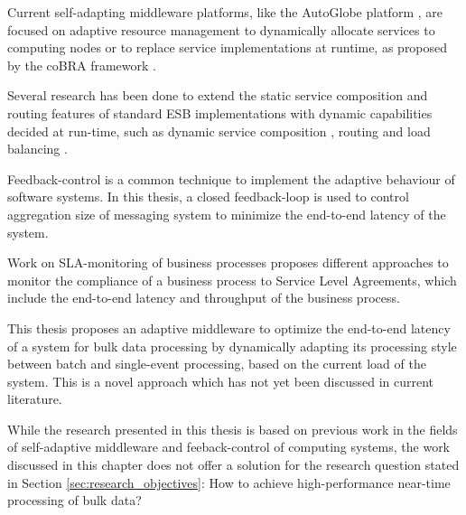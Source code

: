 Current self-adapting middleware platforms, like the AutoGlobe platform \citep{Gmach:2008vo}, are focused on adaptive resource management to dynamically allocate services to computing nodes or to replace service implementations at runtime, as proposed by the coBRA framework \citep{Irmert:2008nx}.

Several research has been done to extend the static service composition and routing features of standard ESB implementations with dynamic capabilities decided at run-time, such as dynamic service composition \citep{Chang:2007aa}, routing \citep{Bai:2007aa} \citep{Wu:2008aa} \citep{Ziyaeva:2008aa} and load balancing \citep{Jongtaveesataporn:2010aa}.

Feedback-control is a common technique to implement the adaptive behaviour of software systems. In this thesis, a closed feedback-loop is used to control aggregation size of messaging system to minimize the end-to-end latency of the system.

Work on SLA-monitoring of business processes proposes different approaches to monitor the compliance of a business process to Service Level Agreements, which include the end-to-end latency and throughput of the business process. 

This thesis proposes an adaptive middleware to optimize the end-to-end latency of a system for bulk data processing by dynamically adapting its processing style between batch and single-event processing, based on the current load of the system. This is a novel approach which has not yet been discussed in current literature.

While the research presented in this thesis is based on previous work in the fields of self-adaptive middleware and feeback-control of computing systems, 
the work discussed in this chapter does not offer a solution for the research question stated in Section \ref{sec:research_objectives}: How to achieve high-performance near-time processing of bulk data?